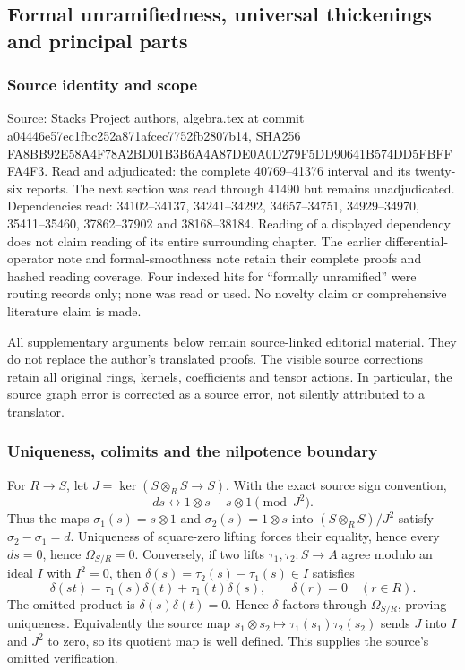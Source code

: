 \subsection{Formal unramifiedness, universal thickenings and principal parts}\label{algebra-proof-055-formal-unramifiedness-universal-thickenings-and-principal-parts}

\subsubsection{Source identity and scope}\label{algebra-proof-055-source-identity-and-scope}

Source: Stacks Project authors, algebra.tex at commit a04446e57ec1fbc252a871afcec7752fb2807b14, SHA256 FA8BB92E58A4F78A2BD01B3B6A4A87DE0A0D279F5DD90641B574DD5FBFFFA4F3. Read and adjudicated: the complete 40769--41376 interval and its twenty-six reports. The next section was read through 41490 but remains unadjudicated. Dependencies read: 34102--34137, 34241--34292, 34657--34751, 34929--34970, 35411--35460, 37862--37902 and 38168--38184. Reading of a displayed dependency does not claim reading of its entire surrounding chapter. The earlier differential-operator note and formal-smoothness note retain their complete proofs and hashed reading coverage. Four indexed hits for ``formally unramified'' were routing records only; none was read or used. No novelty claim or comprehensive literature claim is made.

All supplementary arguments below remain source-linked editorial material. They do not replace the author's translated proofs. The visible source corrections retain all original rings, kernels, coefficients and tensor actions. In particular, the source graph error is corrected as a source error, not silently attributed to a translator.

\subsubsection{Uniqueness, colimits and the nilpotence boundary}\label{algebra-proof-055-uniqueness-colimits-and-the-nilpotence-boundary}

For \(R\to S\), let \(J=\ker(S\otimes_R S\to S)\). With the exact source sign convention, \[
ds\longleftrightarrow 1\otimes s-s\otimes1\pmod {J^2}.
\] Thus the maps \(\sigma_1(s)=s\otimes1\) and \(\sigma_2(s)=1\otimes s\) into \((S\otimes_R S)/J^2\) satisfy \(\sigma_2-\sigma_1=d\). Uniqueness of square-zero lifting forces their equality, hence every \(ds=0\), hence \(\Omega_{S/R}=0\). Conversely, if two lifts \(\tau_1,\tau_2:S\to A\) agree modulo an ideal \(I\) with \(I^2=0\), then \(\delta(s)=\tau_2(s)-\tau_1(s)\in I\) satisfies \[
\delta(st)=\tau_1(s)\delta(t)+\tau_1(t)\delta(s),
\qquad \delta(r)=0\quad(r\in R).
\] The omitted product is \(\delta(s)\delta(t)=0\). Hence \(\delta\) factors through \(\Omega_{S/R}\), proving uniqueness. Equivalently the source map \(s_1\otimes s_2\mapsto\tau_1(s_1)\tau_2(s_2)\) sends \(J\) into \(I\) and \(J^2\) to zero, so its quotient map is well defined. This supplies the source's omitted verification.

